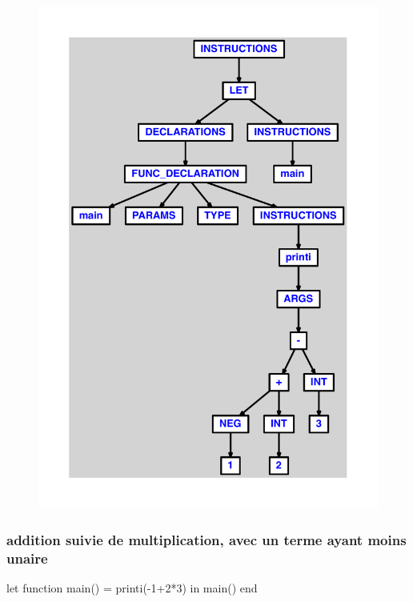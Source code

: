 \documentclass{article}
\begin{document}
\begin{figure}[H]\centering\includegraphics[max width=\textwidth]{ast/ast_68.pdf}\end{figure}\subsubsection{addition suivie de multiplication, avec un terme ayant moins unaire}
\begin{verbatimtab}
let
	function main() = printi(-1+2*3)
in main() end
\end{verbatimtab}
\end{document}
